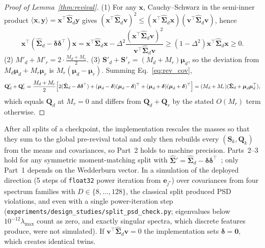 \documentclass[10pt]{article} %
\begin{document}
\begin{proof}[Proof of Lemma~\ref{thm:revival}]
(1) For any $\mathbf{x}$, Cauchy--Schwarz in the semi-inner product $\langle \mathbf{x}, \mathbf{y} \rangle = \mathbf{x}^\top \hat{\boldsymbol{\Sigma}}_d \mathbf{y}$ gives $(\mathbf{x}^\top \hat{\boldsymbol{\Sigma}}_d \mathbf{v})^2 \le (\mathbf{x}^\top \hat{\boldsymbol{\Sigma}}_d \mathbf{x})(\mathbf{v}^\top \hat{\boldsymbol{\Sigma}}_d \mathbf{v})$, hence
\[
\mathbf{x}^\top (\hat{\boldsymbol{\Sigma}}_d - \boldsymbol{\delta}\boldsymbol{\delta}^\top)\mathbf{x}
= \mathbf{x}^\top \hat{\boldsymbol{\Sigma}}_d \mathbf{x} - \Delta^2 \frac{(\mathbf{x}^\top \hat{\boldsymbol{\Sigma}}_d \mathbf{v})^2}{\mathbf{v}^\top \hat{\boldsymbol{\Sigma}}_d \mathbf{v}}
\ge (1 - \Delta^2)\mathbf{x}^\top \hat{\boldsymbol{\Sigma}}_d \mathbf{x} \ge 0.
\]
(2) $M'_d + M'_r = 2 \cdot \frac{M_d + M_r}{2}$.
(3) $\mathbf{S}'_d + \mathbf{S}'_r = (M_d + M_r)\boldsymbol{\mu}_d$, so the deviation from $M_d \boldsymbol{\mu}_d + M_r \boldsymbol{\mu}_r$ is $M_r(\boldsymbol{\mu}_d - \boldsymbol{\mu}_r)$. Summing Eq.~\eqref{eq:rev_cov},
\[
\mathbf{Q}'_d + \mathbf{Q}'_r
= \frac{M_d + M_r}{2}\Bigl[ 2(\hat{\boldsymbol{\Sigma}}_d - \boldsymbol{\delta}\boldsymbol{\delta}^\top) + (\boldsymbol{\mu}_d - \boldsymbol{\delta})(\boldsymbol{\mu}_d - \boldsymbol{\delta})^\top + (\boldsymbol{\mu}_d + \boldsymbol{\delta})(\boldsymbol{\mu}_d + \boldsymbol{\delta})^\top \Bigr]
= (M_d + M_r)(\hat{\boldsymbol{\Sigma}}_d + \boldsymbol{\mu}_d\boldsymbol{\mu}_d^\top),
\]
which equals $\mathbf{Q}_d$ at $M_r = 0$ and differs from $\mathbf{Q}_d + \mathbf{Q}_r$ by the stated $O(M_r)$ term otherwise.
\end{proof}
After all splits of a checkpoint, the implementation rescales the masses so that they sum to the global pre-revival total and only then rebuilds every $(\mathbf{S}_k, \mathbf{Q}_k)$ from the means and covariances, so Part~2 holds to machine precision. Parts~2--3 hold for any symmetric moment-matching split with $\hat{\boldsymbol{\Sigma}}' = \hat{\boldsymbol{\Sigma}}_d - \boldsymbol{\delta}\boldsymbol{\delta}^\top$~\citep{zhang2003em,richardson1997bayesian}; only Part~1 depends on the Wedderburn vector. In a simulation of the deployed direction (5 steps of \texttt{float32} power iteration from $\mathbf{e}_{j^\star}$) over \rSplitTrials{} covariances from four spectrum families with $D \in \{8, \dots, 128\}$, the classical split produced \rSplitViolClassical{} PSD violations, and \rSplitAdvViol{} even with a single power-iteration step (\texttt{experiments/design\_studies/split\_psd\_check.py}; eigenvalues below $10^{-12}\lambda_{\max}$ count as zero, and exactly singular spectra, which discrete features produce, were not simulated). If $\mathbf{v}^\top \hat{\boldsymbol{\Sigma}}_d \mathbf{v} = 0$ the implementation sets $\boldsymbol{\delta} = \mathbf{0}$, which creates identical twins.
\end{document}

